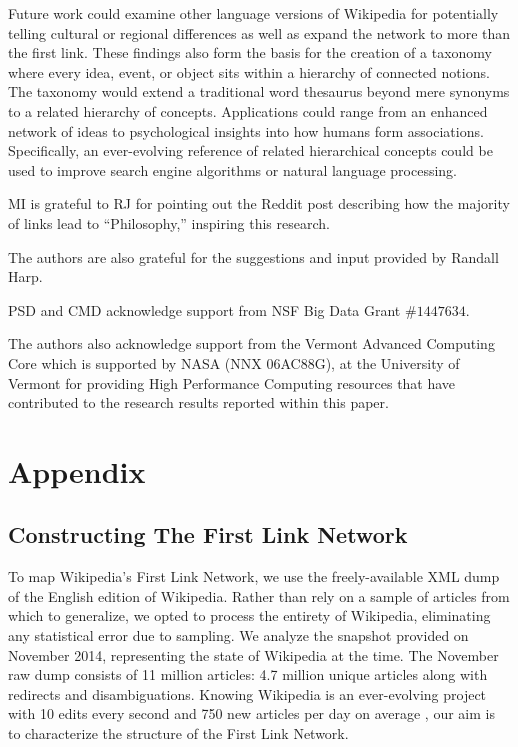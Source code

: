 \documentclass[pre,twocolumn,twoside,superscriptaddress,floatfix, aps, 10pt]{revtex4-1}
\begin{document}
Future work could examine other language versions of Wikipedia for potentially telling cultural or regional differences as well as expand the network to more than the first link.
These findings also form the basis for the creation of a taxonomy where 
every idea, event, or object sits within a hierarchy of connected notions.
The taxonomy would extend a traditional word thesaurus beyond mere synonyms to a related hierarchy of concepts.
Applications could range from an enhanced network of ideas to psychological insights into how humans form associations.
Specifically, an ever-evolving reference of related hierarchical concepts could be 
used to improve search engine algorithms or natural language processing.


\acknowledgments
MI is grateful to RJ for pointing out the Reddit post 
\cite{reddit}
describing how the majority of links lead to ``Philosophy,'' inspiring this research.

The authors are also grateful for the suggestions and input provided by Randall Harp.

PSD and CMD acknowledge support from NSF Big Data Grant $\#1447634$.

The authors also acknowledge support from the Vermont Advanced Computing Core which is supported by NASA (NNX 06AC88G), at the University of Vermont for providing High Performance Computing resources that have contributed to the research results reported within this paper.


\newpage

\section{Appendix}
\label{Appendix}

\subsection{Constructing The First Link Network}

To map Wikipedia's First Link Network, we use the freely-available XML dump of the English edition of Wikipedia. 
Rather than rely on a sample of articles from which to generalize, we opted to process the entirety of Wikipedia, 
eliminating any statistical error due to sampling.
We analyze the snapshot provided on November 2014, representing the state of Wikipedia at the time.
The November raw dump consists of 11 million articles: 4.7 million unique articles along with redirects
and disambiguations.
Knowing Wikipedia is an ever-evolving project with 10 edits every second and 750 new articles per day on average
\cite{wiki_edits},
our aim is to characterize the structure of the First Link Network.
\end{document}
